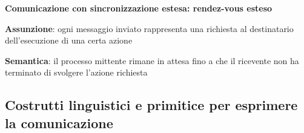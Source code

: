 \documentclass{article}
\begin{document}
\vspace{5mm}
\textbf{Comunicazione con sincronizzazione estesa: rendez-vous esteso}

\textbf{Assunzione}: ogni messaggio inviato rappresenta una richiesta al destinatario dell'esecuzione di una certa azione

\textbf{Semantica}: il processo mittente rimane in attesa fino a che il ricevente non ha terminato di svolgere l'azione richiesta


\subsection{Costrutti linguistici e primitice per esprimere la comunicazione}
\end{document}
